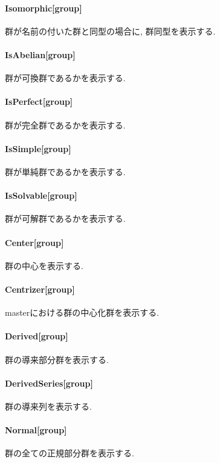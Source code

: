 \documentclass[11pt, a4paper]{jsarticle}
\begin{document}
\paragraph{Isomorphic[group]}
群が名前の付いた群と同型の場合に, 群同型を表示する.

\paragraph{IsAbelian[group]}
群が可換群であるかを表示する.

\paragraph{IsPerfect[group]}
群が完全群であるかを表示する.

\paragraph{IsSimple[group]}
群が単純群であるかを表示する.

\paragraph{IsSolvable[group]}
群が可解群であるかを表示する.

\paragraph{Center[group]}
群の中心を表示する.

\paragraph{Centrizer[group]}
masterにおける群の中心化群を表示する.

\paragraph{Derived[group]}
群の導来部分群を表示する.

\paragraph{DerivedSeries[group]}
群の導来列を表示する.

\paragraph{Normal[group]}
群の全ての正規部分群を表示する.
\end{document}
